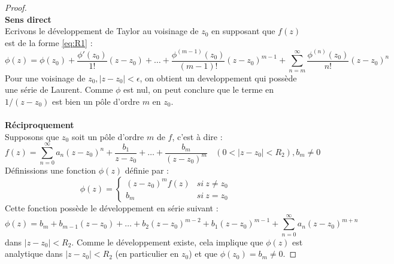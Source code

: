 	\begin{proof}\ \\
	\textbf{Sens direct}\\
	Ecrivons le développement de Taylor au voisinage de $z_0$ en supposant que $f(z)$ 
	est de la forme \autoref{eq:R1}  :
	\begin{equation}
	\phi(z) = \phi(z_0)+ \frac{\phi'(z_0)}{1!}(z-z_0) + \dots + \frac{\phi^{(m-1)}(z_0)}{(m-1)!}
	(z-z_0)^{m-1} + \sum_{n=m}^\infty  \frac{\phi^{(n)}(z_0)}{n!}(z-z_0)^n
	\end{equation}
	Pour une voisinage de $z_0, |z-z_0|<\epsilon$, on obtient un developpement qui possède 
	une série de Laurent. Comme $\phi$ est nul, on peut conclure que le terme en $1/(z-z_0)$
	est bien un pôle d'ordre $m$ en $z_0$.
	\ \\
	\ \\
	\textbf{Réciproquement}\\
	Supposons que $z_0$ soit un pôle d'ordre $m$ de $f$, c'est à dire :
	\begin{equation}
	f(z) = \sum_{n=0}^\infty a_n(z-z_0)^n + \frac{b_1}{z-z_0}+\dots+\frac{b_m}{(z-z_0)^m}\ \
	\ \ (0<|z-z_0|<R_2), b_m\neq0
	\end{equation}
	Définissions une fonction $\phi(z)$ définie par :
	\begin{equation}
	\phi(z) = \left\{\begin{array}{ll}
	(z-z_0)^mf(z) &si\ z\neq z_0\\
	b_m &si\ z=z_0
	\end{array}\right.
	\end{equation}
	Cette fonction possède le développement en série suivant :
	\begin{equation}
	\phi(z) = b_m + b_{m-1}(z-z_0) + \dots +b_2(z-z_0)^{m-2} + b_1(z-z_0)^{m-1} + 
	\sum_{n=0}^\infty a_n(z-z_0)^{m+n}
	\end{equation}
	dans $|z-z_0| < R_2$. Comme le développement existe, cela implique que $\phi(z)$ est 
	analytique dans $|z-z_0|<R_2$ (en particulier en $z_0$) et que $\phi(z_0)=b_m\neq0$.
	\end{proof}
	
	\ \\	
	
